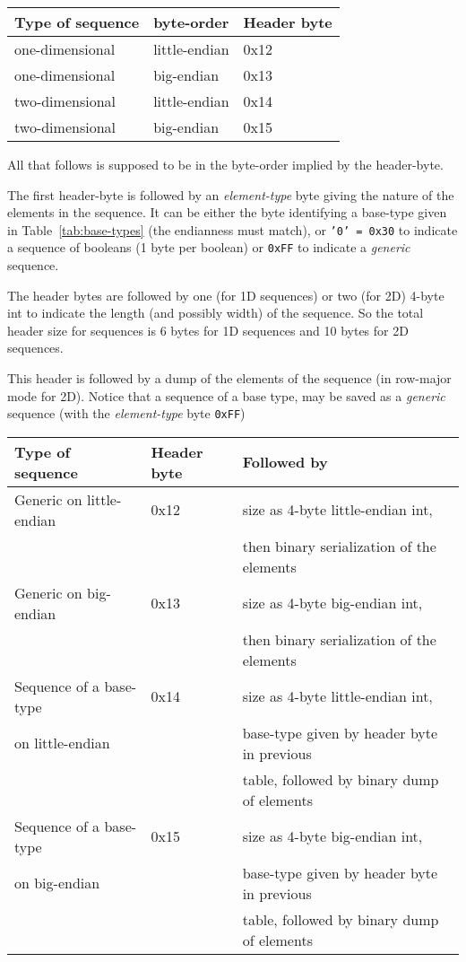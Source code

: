 \documentclass[11pt]{book}
\begin{document}
{\begin{tabular}{|lll|} \hline
Type of sequence & byte-order    & Header byte \\ \hline
one-dimensional  & little-endian & 0x12        \\ 
one-dimensional  & big-endian    & 0x13        \\ 
two-dimensional  & little-endian & 0x14        \\ 
two-dimensional  & big-endian    & 0x15        \\ \hline
\end{tabular}

All that follows is supposed to be in the byte-order implied by the header-byte.

The first header-byte is followed by an {\em element-type} byte giving the nature
of the elements in the sequence.  It can be either the byte identifying a
base-type given in Table~\ref{tab:base-types} (the endianness must match),
or {\tt '0' = 0x30} to indicate a sequence of booleans (1 byte per boolean) 
or {\tt 0xFF} to indicate a {\em generic} sequence.

The header bytes are followed by one (for 1D sequences) or two (for 2D)
4-byte int to indicate the length (and possibly width) of the sequence.
So the total header size for sequences is 6 bytes for 1D sequences and 10
bytes for 2D sequences.

This header is followed by a dump of the elements of the sequence (in
row-major mode for 2D).  Notice that a sequence of a base type, may be
saved as a {\em generic} sequence (with the {\em element-type} byte {\tt 0xFF})



\begin{tabular}{|l|l|l|} \hline
Type of sequence         & Header byte & Followed by \\ \hline
Generic on little-endian & 0x12        & size as 4-byte little-endian int, \\
                         &             & then binary serialization of the elements \\ \hline
Generic on big-endian    & 0x13        & size as 4-byte big-endian int, \\ 
                         &             & then binary serialization of the elements \\ \hline
Sequence of a base-type  & 0x14        & size as 4-byte little-endian int, \\ 
on little-endian         &             & base-type given by header byte in previous \\
                         &             & table, followed by binary dump of elements \\ \hline
Sequence of a base-type  & 0x15        & size as 4-byte big-endian int, \\ 
on big-endian            &             & base-type given by header byte in previous \\
                         &             & table, followed by binary dump of elements \\ \hline
\end{tabular}





}
\end{document}
